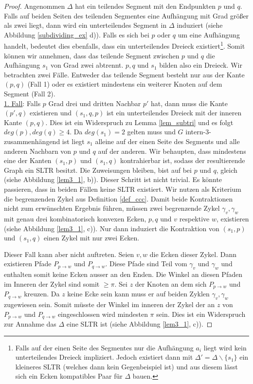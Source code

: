 \begin{proof}
Angenommen $\Delta$ hat ein teilendes Segment mit den Endpunkten $p$ und $q$. Falls auf beiden Seiten des teilenden Segmentes eine Aufhängung mit Grad größer als zwei liegt, dann wird ein unterteilendes Segment in $\Delta$ induziert (siehe Abbildung \ref{subdividing_ex} d)). Falls es sich bei $p$ oder $q$ um eine Aufhängung handelt, bedeutet dies ebenfalls, dass ein unterteilendes Dreieck existiert\footnote{Falls auf der einen Seite des Segmentes nur die Aufhängung $a_i$ liegt wird kein unterteilendes Dreieck impliziert. Jedoch existiert dann mit $\Delta' = \Delta \backslash \{s_1\}$ ein kleineres SLTR (welches dann kein Gegenbeispiel ist) und aus diesem lässt sich ein Ecken kompatibles Paar für $\Delta$ bauen.}. Somit können wir annehmen, dass das teilende Segment zwischen $p$ und $q$ die Aufhängung $s_1$ von Grad zwei abtrennt. $p,q$ und $s_1$ bilden also ein Dreieck. Wir betrachten zwei Fälle. Entweder das teilende Segment besteht nur aus der Kante $(p,q)$ (Fall 1) oder es existiert mindestens ein weiterer Knoten auf dem Segment (Fall 2).\\

\underline{1. Fall}: Falls $p$ Grad drei und dritten Nachbar $p'$ hat, dann muss die Kante $(p',q)$ existieren und $(s_1,q,p)$ ist ein unterteilendes Dreieck mit der inneren Kante $(p,q)$. Dies ist ein Widerspruch zu Lemma \ref{lem_subtri} und es folgt $deg(p),deg(q) \geq 4$. Da $deg(s_1) = 2$ gelten muss und $G$ intern-3-zusammenhängend ist liegt $s_1$ alleine auf der einen Seite des Segments und alle anderen Nachbarn von $p$ und $q$ auf der anderen. 
Wir behaupten, dass mindestens eine der Kanten $(s_1,p)$ und $(s_1,q)$ kontrahierbar ist, sodass der resultierende Graph ein SLTR besitzt. Die Zuweisungen bleiben, bist auf bei $p$ und $q$, gleich (siehe Abbildung \ref{lem3_1}, b)). Dieser Schritt ist nicht trivial. Es könnte passieren, dass in beiden Fällen keine SLTR existiert. Wir nutzen als Kriterium die begrenzenden Zykel aus Definition \ref{def_ccc}. Damit beide Kontraktionen nicht zum erwünschten Ergebnis führen, müssen zwei begrenzende Zykel $\gamma_v,\gamma_w$ mit genau drei kombinatorisch konvexen Ecken, $p,q$ und $v$ respektive $w$, existieren (siehe Abbildung \ref{lem3_1}, c)). Nur dann induziert die Kontraktion von $(s_1,p)$ und $(s_1,q)$ einen Zykel mit nur zwei Ecken. 

Dieser Fall kann aber nicht auftreten. Seien $v,w$ die Ecken dieser Zykel. Dann existieren Pfade $P_{p\to w}$ und $P_{q\to w}$. Diese Pfade sind Teil vom $\gamma_v$ und $\gamma_w$ und enthalten somit keine Ecken ausser an den Enden. Die Winkel an diesen Pfaden im Inneren der Zykel sind somit $\geq \pi$. Sei $z$ der Knoten an dem sich $P_{p\to w}$ und $P_{q\to w}$ kreuzen. Da $z$ keine Ecke sein kann muss er auf beiden Zyklen $\gamma_v,\gamma_w$  zugewiesen sein. Somit müsste der Winkel im inneren der Zykel der an $z$ von $P_{p\to w}$ und $P_{q\to w}$ eingeschlossen wird mindesten $\pi$ sein. Dies ist ein Widerspruch zur Annahme das $\Delta$ eine SLTR ist (siehe Abbildung \ref{lem3_1}, c)).


\end{proof}
